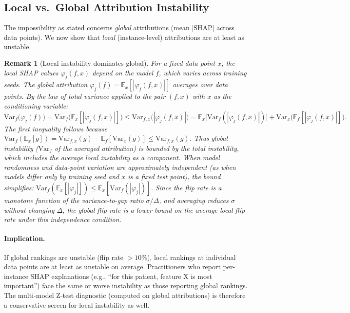 \documentclass{article}
\newtheorem{remark}[theorem]{Remark}
\newcommand{\E}{\mathbb{E}}
\newcommand{\Var}{\mathrm{Var}}
\begin{document}
\subsection{Local vs.\ Global Attribution Instability}
\label{sec:local-global}

The impossibility as stated concerns \emph{global} attributions (mean $|\text{SHAP}|$ across data points). We now show that \emph{local} (instance-level) attributions are at least as unstable.

\begin{remark}[Local instability dominates global]
\label{rem:local-instability}
For a fixed data point $x$, the local SHAP values $\varphi_j(f, x)$ depend on the model $f$, which varies across training seeds. The global attribution $\varphi_j(f) = \E_x[|\varphi_j(f, x)|]$ averages over data points. By the law of total variance applied to the pair $(f, x)$ with $x$ as the conditioning variable:
\[
    \Var_f\!\big(\varphi_j(f)\big) = \Var_f\!\big(\E_x[|\varphi_j(f,x)|]\big) \leq \Var_{f,x}\!\big(|\varphi_j(f,x)|\big) = \E_x\!\big[\Var_f(|\varphi_j(f,x)|)\big] + \Var_x\!\big(\E_f[|\varphi_j(f,x)|]\big).
\]
The first inequality follows because $\Var_f(\E_x[g]) = \Var_{f,x}(g) - \E_f[\Var_x(g)] \leq \Var_{f,x}(g)$.
Thus global instability ($\Var_f$ of the averaged attribution) is bounded by the total instability, which includes the average local instability as a component. When model randomness and data-point variation are approximately independent (as when models differ only by training seed and $x$ is a fixed test point), the bound simplifies: $\Var_f(\E_x[|\varphi_j|]) \leq \E_x[\Var_f(|\varphi_j|)]$.
Since the flip rate is a monotone function of the variance-to-gap ratio $\sigma/\Delta$, and averaging reduces $\sigma$ without changing $\Delta$, the global flip rate is a lower bound on the average local flip rate under this independence condition.
\end{remark}

\paragraph{Implication.}
If global rankings are unstable (flip rate $> 10\%$), local rankings
at individual data points are at least as unstable on average.
Practitioners who report per-instance SHAP explanations (e.g.,
``for this patient, feature X is most important'') face the same
or worse instability as those reporting global rankings. The multi-model Z-test
diagnostic (computed on global attributions) is therefore a
conservative screen for local instability as well.
\end{document}
